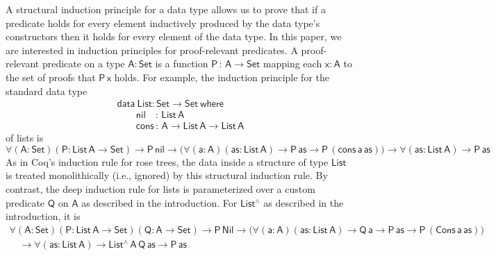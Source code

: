 \documentclass[9pt]{entcs}
\begin{document}
A structural induction principle for a data type allows us to prove
that if a predicate holds for every element inductively produced by
the data type's constructors then it holds for every element of the
data type.  In this paper, we are interested in induction principles
for proof-relevant predicates.  A proof-relevant predicate on a type
$\mathsf{A : Set}$ is a function $\mathsf{P\,:\,A \to Set}$ mapping
each $\mathsf{x : A}$ to the set of proofs that $\mathsf{P\,x}$ holds.
For example, the induction principle for the standard data type
\begin{equation*}\label{eq:list}
\begin{array}{l}
\mathsf{data\ List : Set \to Set\ where}\\
\mathsf{\;\;\;\;\;\;\;nil\,\,\,\,\,\, :\, List\,A}\\
\mathsf{\;\;\;\;\;\;\;cons\, :\, A \to List\,A \to List\,A} 
\end{array}
\end{equation*}
of lists is
\begin{equation*}
\mathsf{
\forall (A : Set) (P : List\,A \to Set)
\to P\,nil
\to \big( \forall (a : A) (as: List\,A)
\to P\,as
\to P\,(cons\,a\,as)\big)
\to \forall (as : List\,A)
\to P\, as
}
\end{equation*}
As in Coq's induction rule for rose trees, the data inside a
structure of type $\mathsf{List}$ is treated monolithically (i.e.,
ignored) by this structural induction rule.
By contrast, the deep induction rule for lists is parameterized over a
custom predicate $\mathsf{Q}$ on $\mathsf{A}$ as described in the
introduction. For $\mathsf{List^\wedge}$ as described in the
introduction, it is
\[
\begin{array}{l}
\mathsf{\forall (A : Set) (P : List\, A \to Set) (Q : A \to Set)
\to P\,Nil \to \big( \forall (a : A) (as: List\,A) \to Q\,a \to P\,as
\to P\,(Cons\,a\,as)\big)} \\ 
\quad\mathsf{\to \forall (as : List\,A) \to List^{\wedge}\,A\,Q\,as
  \to P\,as } 
\end{array}
\]
\end{document}
